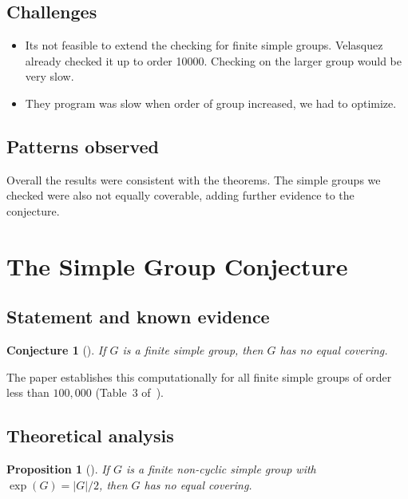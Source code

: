\documentclass[12pt, a4paper]{article}
\theoremstyle{plain}
\newtheorem{proposition}[theorem]{Proposition}
\newtheorem{conjecture}[theorem]{Conjecture}
\theoremstyle{definition}
\DeclareMathOperator{\Exp}{exp}
\begin{document}
\subsection{Challenges}
\begin{itemize}
  \item Its not feasible to extend the checking for finite simple groups. Velasquez \cite{velasquez2022} already checked it up to order 10000. Checking on the larger group would be very slow.
  \item They program was slow when order of group increased, we had to optimize. 

\end{itemize}


\subsection{Patterns observed}
Overall the results were consistent with the theorems. The simple groups we checked were also not equally coverable, adding further evidence to the conjecture.

\section{The Simple Group Conjecture}
\label{sec:conjecture}

\subsection{Statement and known evidence}

\begin{conjecture}[{\cite[p.~21]{velasquez2022}}]
  If $G$ is a finite simple group, then $G$ has no equal covering.
\end{conjecture}

The paper establishes this computationally for all finite simple groups of
order less than $100{,}000$ (Table~3 of~\cite{velasquez2022}).

\subsection{Theoretical analysis}

\begin{proposition}[{\cite[Proposition~2]{velasquez2022}}]
  If $G$ is a finite non-cyclic simple group with $\Exp(G) = |G|/2$, then
  $G$ has no equal covering.
\end{proposition}
\end{document}
